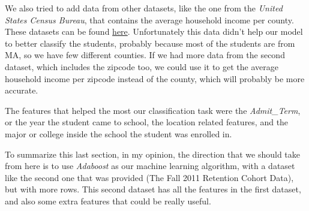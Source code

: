 \documentclass{article}
\begin{document}
We also tried to add data from other datasets, like the one from the \textit{United States Census Bureau}, that contains the average household income per county. These datasets can be found \href{https://www.census.gov/support/USACdataDownloads.html}{here}. Unfortunately this data didn't help our model to better classify the students, probably because most of the students are from MA, so we have few different counties. If we had more data from the second dataset, which includes the zipcode too, we could use it to get the average household income per zipcode instead of the county, which will probably be more accurate.

The features that helped the most our classification task were the \textit{Admit\_Term}, or the year the student came to school, the location related features, and the major or college inside the school the student was enrolled in. 

To summarize this last section, in my opinion, the direction that we should take from here is to use \textit{Adaboost} as our machine learning algorithm, with a dataset like the second one that was provided (The Fall 2011 Retention Cohort Data), but with more rows. This second dataset has all the features in the first dataset, and also some extra features that could be really useful.
\end{document}
